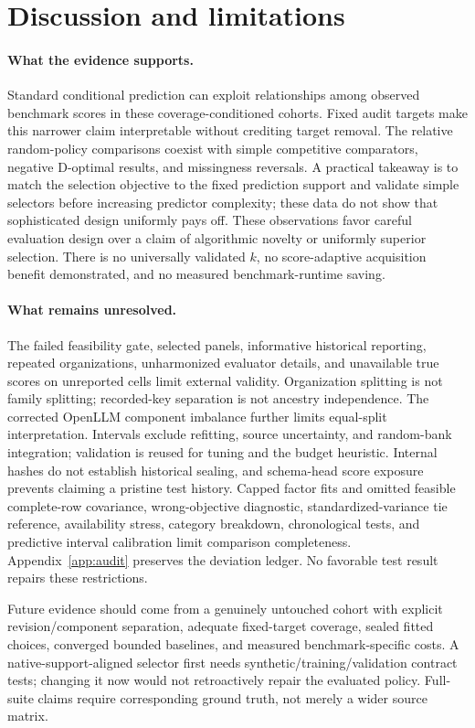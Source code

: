 \documentclass{article}
\begin{document}
\section{Discussion and limitations}\label{sec:discussion}
\paragraph{What the evidence supports.}
Standard conditional prediction can exploit relationships among observed benchmark scores in these coverage-conditioned cohorts. Fixed audit targets make this narrower claim interpretable without crediting target removal. The relative random-policy comparisons coexist with simple competitive comparators, negative D-optimal results, and missingness reversals. A practical takeaway is to match the selection objective to the fixed prediction support and validate simple selectors before increasing predictor complexity; these data do not show that sophisticated design uniformly pays off. These observations favor careful evaluation design over a claim of algorithmic novelty or uniformly superior selection. There is no universally validated $k$, no score-adaptive acquisition benefit demonstrated, and no measured benchmark-runtime saving.

\paragraph{What remains unresolved.}
The failed feasibility gate, selected panels, informative historical reporting, repeated organizations, unharmonized evaluator details, and unavailable true scores on unreported cells limit external validity. Organization splitting is not family splitting; recorded-key separation is not ancestry independence. The corrected OpenLLM component imbalance further limits equal-split interpretation. Intervals exclude refitting, source uncertainty, and random-bank integration; validation is reused for tuning and the budget heuristic. Internal hashes do not establish historical sealing, and schema-head score exposure prevents claiming a pristine test history. Capped factor fits and omitted feasible complete-row covariance, wrong-objective diagnostic, standardized-variance tie reference, availability stress, category breakdown, chronological tests, and predictive interval calibration limit comparison completeness. Appendix~\ref{app:audit} preserves the deviation ledger. No favorable test result repairs these restrictions.

Future evidence should come from a genuinely untouched cohort with explicit revision/component separation, adequate fixed-target coverage, sealed fitted choices, converged bounded baselines, and measured benchmark-specific costs. A native-support-aligned selector first needs synthetic/training/validation contract tests; changing it now would not retroactively repair the evaluated policy. Full-suite claims require corresponding ground truth, not merely a wider source matrix.
\end{document}
